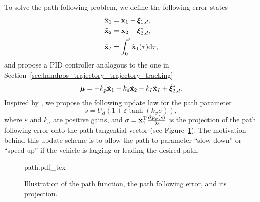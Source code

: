 To solve the path following problem, we define the following error states
\begin{subequations}
    \begin{align}
        \tilde{\mathbf{x}}_1 &= \mathbf{x}_1 - \bm{\xi}_{1, d}, \\
        \tilde{\mathbf{x}}_2 &= \mathbf{x}_2 - \bm{\xi}_{2, d}^{*}, \\
        \tilde{\mathbf{x}}_I &= \int_{0}^t \tilde{\mathbf{x}}_1(\tau) {\rm d}\tau,
    \end{align}
\end{subequations}
and propose a PID controller analogous to the one in Section~\ref{sec:handpos_trajectory_trajectory_tracking}
\begin{equation}
    \bm{\mu} = -k_p\tilde{\mathbf{x}}_1 - k_d\tilde{\mathbf{x}}_2 - k_I\tilde{\mathbf{x}}_I + \dot{\bm{\xi}}_{2, d}^{*}.
\end{equation}
Inspired by \cite{belleter_2019_observer}, we propose the following update law for the path parameter 
\begin{equation}
    \dot{s} = U_d\left(1 + \varepsilon\tanh\left(k_{\sigma}\sigma\right)\right), \label{eq:handpos_trajectory_s_dot}
\end{equation}
where $\varepsilon$ and $k_{\sigma}$ are positive gains, and $\sigma = \tilde{\mathbf{x}}_1^{\mathrm{T}} \frac{\partial \mathbf{p}_p(s)}{\partial s}$ is the projection of the path following error onto the path-tangential vector (see Figure~\ref{fig:handpos_trajectory_path}).
The motivation behind this update scheme is to allow the path to parameter ``slow down'' or ``speed up'' if the vehicle is lagging or leading the desired path.

\begin{figure}[tb]
    \centering
    \def\svgwidth{0.6 \textwidth}
    {path.pdf_tex}
    \vspace*{-2mm}
    \caption{Illustration of the path function, the path following error, and its projection.}
    \label{fig:handpos_trajectory_path}
\end{figure}

